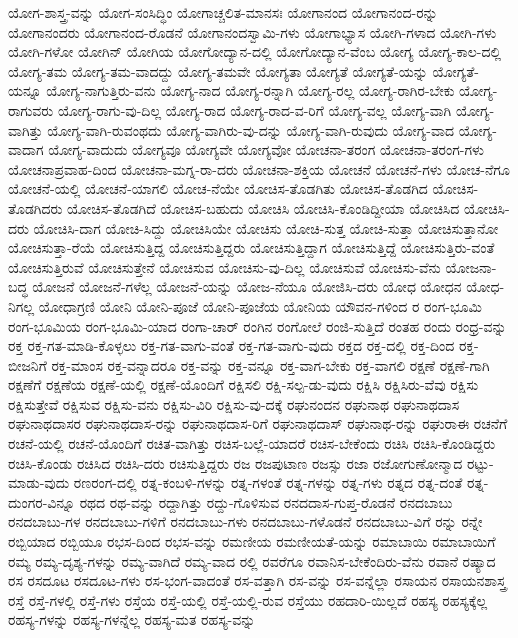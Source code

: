 {ಯೋಗ-ಶಾಸ್ತ್ರ-ವನ್ನು
ಯೋಗ-ಸಂಸಿದ್ಧಿಂ
ಯೋಗಾಚ್ಚಲಿತ-ಮಾನಸಃ
ಯೋಗಾನಂದ
ಯೋಗಾನಂದ-ರನ್ನು
ಯೋಗಾನಂದರು
ಯೋಗಾನಂದ-ರೊಡನೆ
ಯೋಗಾನಂದಸ್ವಾಮಿ-ಗಳು
ಯೋಗಾಭ್ಯಾಸ
ಯೋಗಿ-ಗಳಾದ
ಯೋಗಿ-ಗಳು
ಯೋಗಿ-ಗಳೋ
ಯೋಗಿನ್
ಯೋಗಿಯ
ಯೋಗೋದ್ಯಾನ-ದಲ್ಲಿ
ಯೋಗೋದ್ಯಾನ-ವೆಂಬ
ಯೋಗ್ಯ
ಯೋಗ್ಯ-ಕಾಲ-ದಲ್ಲಿ
ಯೋಗ್ಯ-ತಮ
ಯೋಗ್ಯ-ತಮ-ವಾದದ್ದು
ಯೋಗ್ಯ-ತಮವೇ
ಯೋಗ್ಯತಾ
ಯೋಗ್ಯತೆ
ಯೋಗ್ಯತೆ-ಯನ್ನು
ಯೋಗ್ಯತೆ-ಯನ್ನೂ
ಯೋಗ್ಯ-ನಾಗುತ್ತಿರು-ವನು
ಯೋಗ್ಯ-ನಾದ
ಯೋಗ್ಯ-ರನ್ನಾಗಿ
ಯೋಗ್ಯ-ರಲ್ಲ
ಯೋಗ್ಯ-ರಾಗಿರ-ಬೇಕು
ಯೋಗ್ಯ-ರಾಗುವರು
ಯೋಗ್ಯ-ರಾಗು-ವು-ದಿಲ್ಲ
ಯೋಗ್ಯ-ರಾದ
ಯೋಗ್ಯ-ರಾದ-ವ-ರಿಗೆ
ಯೋಗ್ಯ-ವಲ್ಲ
ಯೋಗ್ಯ-ವಾಗಿ
ಯೋಗ್ಯ-ವಾಗಿತ್ತು
ಯೋಗ್ಯ-ವಾಗಿ-ರುವಂಥದು
ಯೋಗ್ಯ-ವಾಗಿರು-ವು-ದನ್ನು
ಯೋಗ್ಯ-ವಾಗಿ-ರುವುದು
ಯೋಗ್ಯ-ವಾದ
ಯೋಗ್ಯ-ವಾದಾಗ
ಯೋಗ್ಯ-ವಾದುದು
ಯೋಗ್ಯವೂ
ಯೋಗ್ಯವೇ
ಯೋಗ್ಯವೋ
ಯೋಚನಾ-ತರಂಗ
ಯೋಚನಾ-ತರಂಗ-ಗಳು
ಯೋಚನಾಪ್ರವಾಹ-ದಿಂದ
ಯೋಚನಾ-ಮಗ್ನ-ರಾ-ದರು
ಯೋಚನಾ-ಶಕ್ತಿಯ
ಯೋಚನೆ
ಯೋಚನೆ-ಗಳು
ಯೋಚ-ನೆಗೂ
ಯೋಚನೆ-ಯಲ್ಲಿ
ಯೋಚನೆ-ಯಾಗಲಿ
ಯೋಚ-ನೆಯೇ
ಯೋಚಿಸ-ತೊಡಗಿತು
ಯೋಚಿಸ-ತೊಡಗಿದ
ಯೋಚಿಸ-ತೊಡಗಿದರು
ಯೋಚಿಸ-ತೊಡಗಿದೆ
ಯೋಚಿಸ-ಬಹುದು
ಯೋಚಿಸಿ
ಯೋಚಿಸಿ-ಕೊಂಡಿದ್ದೀಯಾ
ಯೋಚಿಸಿದ
ಯೋಚಿಸಿ-ದರು
ಯೋಚಿಸಿ-ದಾಗ
ಯೋಚಿ-ಸಿದ್ದು
ಯೋಚಿಸಿಯೇ
ಯೋಚಿಸು
ಯೋಚಿ-ಸುತ್ತ
ಯೋಚಿ-ಸುತ್ತಾ
ಯೋಚಿಸುತ್ತಾನೋ
ಯೋಚಿಸುತ್ತಾ-ರೆಯೆ
ಯೋಚಿಸುತ್ತಿದ್ದ
ಯೋಚಿಸುತ್ತಿದ್ದರು
ಯೋಚಿಸುತ್ತಿದ್ದಾಗ
ಯೋಚಿಸುತ್ತಿದ್ದೆ
ಯೋಚಿಸುತ್ತಿರು-ವಂತೆ
ಯೋಚಿಸುತ್ತಿರುವೆ
ಯೋಚಿಸುತ್ತೇನೆ
ಯೋಚಿಸುವ
ಯೋಚಿಸು-ವು-ದಿಲ್ಲ
ಯೋಚಿಸುವೆ
ಯೋಚಿಸು-ವೆನು
ಯೋಜನಾ-ಬದ್ಧ
ಯೋಜನೆ
ಯೋಜನೆ-ಗಳೆಲ್ಲ
ಯೋಜನೆ-ಯನ್ನು
ಯೋಜ-ನೆಯೂ
ಯೋಜಿಸಿ-ದರು
ಯೋಧ
ಯೋಧನ
ಯೋಧ-ನಿಗಲ್ಲ
ಯೋಧಾಗ್ರಣಿ
ಯೋನಿ
ಯೋನಿ-ಪೂಜೆ
ಯೋನಿ-ಪೂಜೆಯ
ಯೋನಿಯ
ಯೌವನ-ಗಳಿಂದ
ರ
ರಂಗ-ಭೂಮಿ
ರಂಗ-ಭೂಮಿಯ
ರಂಗ-ಭೂಮಿ-ಯಾದ
ರಂಗಾ-ಚಾರ್
ರಂಗಿನ
ರಂಗೋಲೆ
ರಂಜಿ-ಸುತ್ತಿದೆ
ರಂತಹ
ರಂದು
ರಂಧ್ರ-ವನ್ನು
ರಕ್ತ
ರಕ್ತ-ಗತ-ಮಾಡಿ-ಕೊಳ್ಳಲು
ರಕ್ತ-ಗತ-ವಾಗು-ವಂತೆ
ರಕ್ತ-ಗತ-ವಾಗು-ವುದು
ರಕ್ತದ
ರಕ್ತ-ದಲ್ಲಿ
ರಕ್ತ-ದಿಂದ
ರಕ್ತ-ಬೀಜನಿಗೆ
ರಕ್ತ-ಮಾಂಸ
ರಕ್ತ-ವನ್ನಾದರೂ
ರಕ್ತ-ವನ್ನು
ರಕ್ತ-ವನ್ನೂ
ರಕ್ತ-ವಾಗ-ಬೇಕು
ರಕ್ತ-ವಾಗಲಿ
ರಕ್ಷಣೆ
ರಕ್ಷಣೆ-ಗಾಗಿ
ರಕ್ಷಣೆಗೆ
ರಕ್ಷಣೆಯ
ರಕ್ಷಣೆ-ಯಲ್ಲಿ
ರಕ್ಷಣೆ-ಯೊಂದಿಗೆ
ರಕ್ಷಿಸಲಿ
ರಕ್ಷಿ-ಸಲ್ಪ-ಡು-ವುದು
ರಕ್ಷಿಸಿ
ರಕ್ಷಿಸಿರು-ವೆವು
ರಕ್ಷಿಸು
ರಕ್ಷಿಸುತ್ತೇವೆ
ರಕ್ಷಿಸುವ
ರಕ್ಷಿಸು-ವನು
ರಕ್ಷಿಸು-ವಿರಿ
ರಕ್ಷಿಸು-ವು-ದಕ್ಕೆ
ರಘುನಂದನ
ರಘುನಾಥ
ರಘುನಾಥದಾಸ
ರಘುನಾಥದಾಸರ
ರಘುನಾಥದಾಸ-ರನ್ನು
ರಘುನಾಥದಾಸ-ರಿಗೆ
ರಘುನಾಥದಾಸ್
ರಘುನಾಥ-ರನ್ನು
ರಘುರಾಈ
ರಚನೆಗೆ
ರಚನೆ-ಯಲ್ಲಿ
ರಚನೆ-ಯೊಂದಿಗೆ
ರಚಿತ-ವಾಗಿತ್ತು
ರಚಿಸ-ಬಲ್ಲೆ-ಯಾದರೆ
ರಚಿಸ-ಬೇಕೆಂದು
ರಚಿಸಿ
ರಚಿಸಿ-ಕೊಂಡಿದ್ದರು
ರಚಿಸಿ-ಕೊಂಡು
ರಚಿಸಿದ
ರಚಿಸಿ-ದರು
ರಚಿಸುತ್ತಿದ್ದರು
ರಜ
ರಜಪುಟಾಣ
ರಜಸ್ಸು
ರಜಾ
ರಜೋಗುಣೋನ್ಮಾದ
ರಟ್ಟು-ಮಾಡು-ವುದು
ರಣರಂಗ-ದಲ್ಲಿ
ರತ್ನ-ಕಂಬಳಿ-ಗಳನ್ನು
ರತ್ನ-ಗಳಂತೆ
ರತ್ನ-ಗಳನ್ನು
ರತ್ನ-ಗಳು
ರತ್ನದ
ರತ್ನ-ದಂತೆ
ರತ್ನ-ದುಂಗರ-ವಿನ್ನೂ
ರಥದ
ರಥ-ವನ್ನು
ರದ್ದಾಗಿತ್ತು
ರದ್ದು-ಗೊಳಿಸುವ
ರನದದಾಸ-ಗುಪ್ತ-ರೊಡನೆ
ರನದಬಾಬು
ರನದಬಾಬು-ಗಳ
ರನದಬಾಬು-ಗಳಿಗೆ
ರನದಬಾಬು-ಗಳು
ರನದಬಾಬು-ಗಳೊಡನೆ
ರನದಬಾಬು-ವಿಗೆ
ರನ್ನು
ರನ್ನೇ
ರಬ್ಬಿಯಾದ
ರಬ್ಬಿಯೂ
ರಭಸ-ದಿಂದ
ರಭಸ-ವನ್ನು
ರಮಣೀಯ
ರಮಣೀಯತೆ-ಯನ್ನು
ರಮಾಬಾಯಿ
ರಮಾಬಾಯಿಗೆ
ರಮ್ಯ
ರಮ್ಯ-ದೃಶ್ಯ-ಗಳನ್ನು
ರಮ್ಯ-ವಾಗಿದೆ
ರಮ್ಯ-ವಾದ
ರಲ್ಲಿ
ರವರೆಗೂ
ರವಾನಿಸ-ಬೇಕೆಂದಿರು-ವೆನು
ರವಾನೆ
ರಷ್ಯಾದ
ರಸ
ರಸದೂಟ
ರಸದೂಟ-ಗಳು
ರಸ-ಭಂಗ-ವಾದಂತೆ
ರಸ-ವತ್ತಾಗಿ
ರಸ-ವನ್ನು
ರಸ-ವನ್ನೆಲ್ಲಾ
ರಸಾಯನ
ರಸಾಯನಶಾಸ್ತ್ರ
ರಸ್ತೆ
ರಸ್ತೆ-ಗಳಲ್ಲಿ
ರಸ್ತೆ-ಗಳು
ರಸ್ತೆಯ
ರಸ್ತೆ-ಯಲ್ಲಿ
ರಸ್ತೆ-ಯಲ್ಲಿ-ರುವ
ರಸ್ತೆಯು
ರಹದಾರಿ-ಯಿಲ್ಲದೆ
ರಹಸ್ಯ
ರಹಸ್ಯಕ್ಕೆಲ್ಲ
ರಹಸ್ಯ-ಗಳನ್ನು
ರಹಸ್ಯ-ಗಳನ್ನೆಲ್ಲ
ರಹಸ್ಯ-ಮತ
ರಹಸ್ಯ-ವನ್ನು
}
